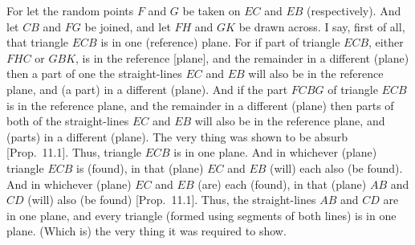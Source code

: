 \begin{Parallel}{}{}
{For let the random points $F$ and $G$ be taken on $EC$ and
$EB$ (respectively). And let $CB$ and $FG$ be joined, and let
$FH$ and $GK$ be drawn across. I say, first of all, that triangle
$ECB$ is in one (reference) plane. For if part of triangle $ECB$, either $FHC$ or
$GBK$, is in the reference [plane], and the remainder in a different (plane)
then a part  of one the straight-lines $EC$ and $EB$
will also be in the reference plane, and (a part) in a different (plane).
And if the part $FCBG$ of triangle $ECB$ is in the reference plane, and
the remainder in a different (plane) then parts of both of the straight-lines
$EC$ and $EB$ will also be in  the reference plane, and (parts) in a
different (plane). The very thing was shown to be absurb [Prop.~11.1]. Thus, triangle $ECB$ is in
one plane. And in whichever (plane) triangle $ECB$ is (found),  in that (plane) $EC$ and $EB$ (will) each also (be found). And in whichever (plane) 
 $EC$
and $EB$ (are) each (found), in that (plane) $AB$ and $CD$ (will) also (be found)  [Prop.~11.1]. Thus, the straight-lines $AB$ and
$CD$ are in one plane, and every triangle (formed using segments of
both lines) is in one plane. (Which is) the very thing it was required to
show.}
\end{Parallel}

